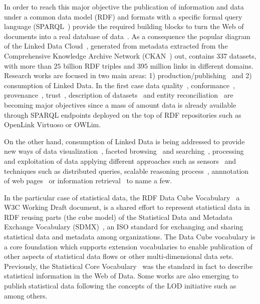\documentclass{llncs}
\begin{document}
In order to reach this major objective the publication of information and data under a common data model (RDF) and formats with 
a specific formal query language (SPARQL~\cite{Sparql11}) provide the required building blocks to turn the Web of documents 
into a real database of data~\cite{freebase}. As a consequence the popular diagram of the Linked Data Cloud~\cite{linked-data-cloud}, 
generated from metadata extracted from the Comprehensive Knowledge Archive Network (CKAN~\cite{ckan}) out, 
contains $337$ datasets, with more than $25$ billion RDF triples and $395$ million links in different  domains. 
Research works are focused in two main areas: 1) production/publishing~\cite{bizer07how} and 2) consumption of  Linked Data. 
In the first case data quality~\cite{bizer2007,wiqa,ld-quality,lodq,link-qa}, conformance~\cite{HoganUHCPD:2012:237}, 
provenance~\cite{w3c-prov,DBLP:conf/ipaw/HartigZ10}, trust~\cite{Carroll05namedgraphs}, description of datasets~\cite{void,Cyganiak08semanticsitemaps,ckanValidator} and 
entity reconciliation~\cite{Serimi,Maali_Cyganiak_2011} are becoming major objectives since a mass of amount data is already available~\cite{Triplify} 
through SPARQL endpoints deployed on the top of RDF repositories such as OpenLink Virtuoso or OWLim. 

On the other hand, consumption of Linked Data is being addressed to provide new ways of data visualization~\cite{DBLP:journals/semweb/DadzieR11,hoga-etal-2011-swse-JWS}, 
faceted browsing~\cite{Pietriga06fresnel,citeulike:8529753,Sparallax} and searching~\cite{hoga-etal-2011-swse-JWS}, processing~\cite{Harth:2011:SIP:1963192.1963318} and exploitation of data applying 
different approaches such as sensors~\cite{Jeung:2010:EMM:1850003.1850235,ontology-search} and techniques  such as distributed 
queries\cite{Hartig09executingsparql,Ankolekar07thetwo,sparqlOpt}, scalable reasoning process~\cite{DBLP:conf/semweb/UrbaniKOH09,HoganHarthPolleres2009,DBLP:conf/semweb/HoganPPD10}, 
annnotation of web pages~\cite{rdfa-primer} or information retrieval~\cite{Pound} to name a few.

In the particular case of statistical data, the RDF Data Cube Vocabulary~\cite{rdf-data-cube}
a W3C Working Draft document, is a shared effort to represent statistical data in RDF reusing parts (the cube model) 
of the Statistical Data and Metadata Exchange Vocabulary (SDMX)~\cite{sdmx}, an ISO standard 
for exchanging and sharing statistical data and metadata among organizations. The Data Cube vocabulary is a core 
foundation which supports extension vocabularies to enable publication of other aspects of statistical data flows or 
other multi-dimensional data sets. Previously, the Statistical Core Vocabulary~\cite{scovo} was the standard in fact to describe statistical information in the Web of Data.
Some works are also emerging to publish statistical data following the concepts of the LOD initiative 
such as~\cite{DBLP:conf/semweb/ZapilkoM11,DBLP:journals/ijsc/SalasMBCMA12,DDI2013,DBLP:conf/dgo/FernandezMG11} among others.
\end{document}
